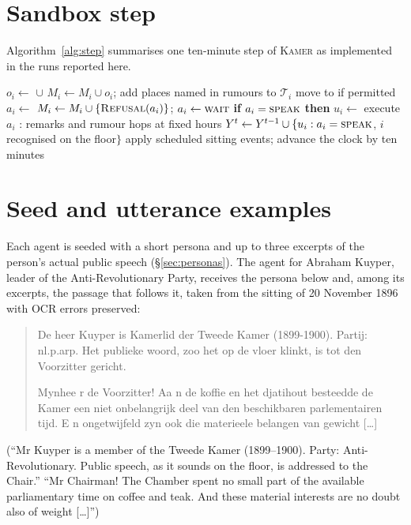 \documentclass[sigconf,review,anonymous]{acmart}
\newcommand{\sys}{\textsc{Kamer}}
\begin{document}



\appendix

\section{Sandbox step}
\label{app:alg}
Algorithm~\ref{alg:step} summarises one ten-minute step of \sys{} as
implemented in the runs reported here.

\begin{algorithm}[t]
\caption{One sandbox step of \sys{}}
\label{alg:step}
\small
\begin{algorithmic}[1]
  \State $o_i \gets$  $\cup$  
  \State $M_i \gets M_i \cup o_i$; add places named in rumours to $\mathcal{T}_i$
  \State move to  if permitted
  \State $a_i \gets$ 
     \State $M_i \gets M_i\cup\{\textsc{Refusal}(a_i)\}$;\; $a_i\gets\textsc{wait}$
  \EndIf
  \State \textbf{if} $a_i=\textsc{speak}$ \textbf{then} $u_i \gets$ 
  \State execute $a_i$ 
\EndFor
\State {}: remarks and rumour hops at fixed hours
\State $Y^{t}\gets Y^{t-1}\cup\{u_i : a_i=\textsc{speak}$, $i$ recognised on the floor$\}$
\State apply scheduled sitting events; advance the clock by ten minutes
\end{algorithmic}
\end{algorithm}

\section{Seed and utterance examples}
\label{app:examples}
Each agent is seeded with a short persona and up to three excerpts of the person's actual public speech (\S\ref{sec:personas}). The agent for Abraham Kuyper, leader of the Anti-Revolutionary Party, receives the persona below
and, among its excerpts, the passage that follows it, taken from the
sitting of 20 November 1896 with OCR errors preserved:
\begin{quote}\small\ttfamily\raggedright
De heer Kuyper is Kamerlid der Tweede Kamer (1899-1900). Partij: nl.p.arp.
Het publieke woord, zoo het op de vloer klinkt, is tot den Voorzitter
gericht.\par\smallskip
Mynhee r de Voorzitter! Aa n de koffie en het djatihout besteedde de Kamer
een niet onbelangrijk deel van den beschikbaren parlementairen tijd. E n
ongetwijfeld zyn ook die materieele belangen van gewicht [\ldots]
\end{quote}
(``Mr Kuyper is a member of the Tweede Kamer (1899--1900). Party:
Anti-Revolutionary. Public speech, as it sounds on the floor, is addressed
to the Chair.'' ``Mr Chairman! The Chamber spent no small part of the
available parliamentary time on coffee and teak. And these material
interests are no doubt also of weight [\ldots]'')
\end{document}
